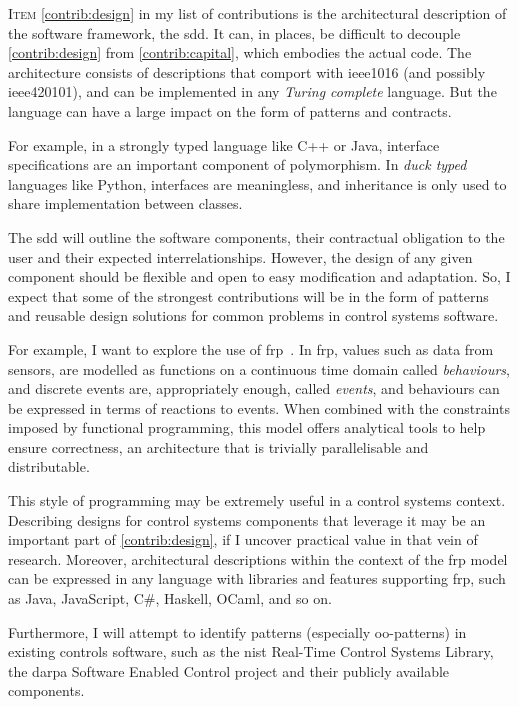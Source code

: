 \textsc{Item} \ref{contrib:design} in my list of contributions is the
architectural description of the software framework, the \ac{sdd}. It can, in
places, be difficult to decouple \ref{contrib:design} from
\ref{contrib:capital}, which embodies the actual code. The architecture consists
of descriptions that comport with \acl{ieee1016} (and possibly
\acl{ieee420101}), and can be implemented in any \emph{Turing complete}
language. But the language can have a large impact on the form of patterns and
contracts.

For example, in a strongly typed language like C++ or Java, interface
specifications are an important component of polymorphism. In \emph{duck typed}
languages like Python, interfaces are meaningless, and inheritance is only used
to share implementation between classes.

The \ac{sdd} will outline the software components, their contractual obligation
to the user and their expected interrelationships. However, the design of any
given component should be flexible and open to easy modification and adaptation.
So, I expect that some of the strongest contributions will be in the form of
patterns and reusable design solutions for common problems in control systems
software.

For example, I want to explore the use of \ac{frp}~\cite{Elliott1997}. In
\ac{frp}, values such as data from sensors, are modelled as functions on a
continuous time domain called \emph{behaviours}, and discrete events are,
appropriately enough, called \emph{events}, and behaviours can be expressed in
terms of reactions to events. When combined with the constraints imposed by
functional programming, this model offers analytical tools to help ensure
correctness, an architecture that is trivially parallelisable and distributable.

This style of programming may be extremely useful in a control systems context.
Describing designs for control systems components that leverage it may be an
important part of \ref{contrib:design}, if I uncover practical value in that
vein of research. Moreover, architectural descriptions within the context of the
\ac{frp} model can be expressed in any language with libraries and features
supporting \ac{frp}, such as Java, JavaScript, C\#, Haskell, OCaml, and so on.

Furthermore, I will attempt to identify patterns (especially \ac{oo}-patterns)
in existing controls software, such as the \ac{nist} Real-Time Control Systems
Library, the \ac{darpa} Software Enabled Control project and their publicly
available components.



